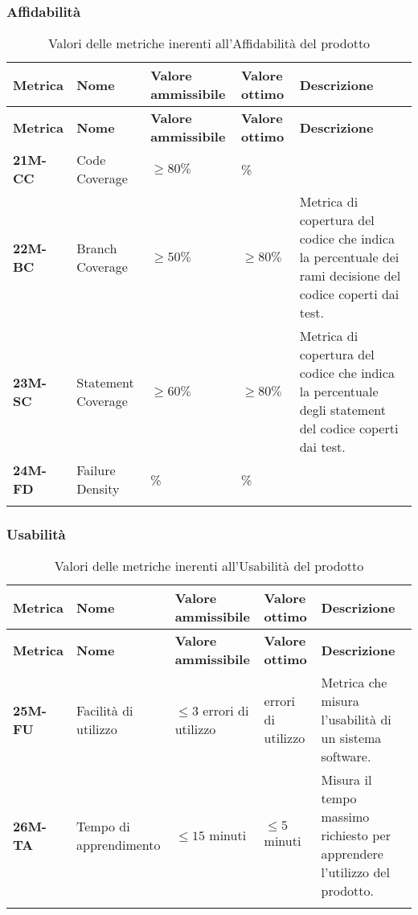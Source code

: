 \subsubsection{Affidabilità}
\begin{longtable}{|>{\centering\arraybackslash}p{}|>{\centering\arraybackslash}p{}|>{\centering\arraybackslash}p{}|>{\centering\arraybackslash}p{}|>{\centering\arraybackslash}p{}|}
    \hline
    \textbf{Metrica} & \textbf{Nome} & \textbf{Valore ammissibile} & \textbf{Valore ottimo}& \textbf{Descrizione}\\
	\hline
    \endfirsthead
    \hline
    \textbf{Metrica} & \textbf{Nome} & \textbf{Valore ammissibile} & \textbf{Valore ottimo}& \textbf{Descrizione}\\
    \endhead
	\hline
	\textbf{21M-CC} & Code Coverage & $\geq 80\% $  & 100\% &\\
	\hline
	\textbf{22M-BC} & Branch Coverage & $\geq 50\% $  & $\geq 80\% $ & Metrica di copertura del codice che indica la percentuale dei rami decisione del codice coperti dai test.\\ 
	\hline
	\textbf{23M-SC} & Statement Coverage & $\geq 60\% $ & $\geq 80\% $ & Metrica di copertura del codice che indica la percentuale degli statement del codice coperti dai test.\\ 
	\hline
	\textbf{24M-FD} & Failure Density & 100\%  & 100\%  &\\ 
	\hline
	\caption{ Valori delle metriche inerenti all'Affidabilità del prodotto}
	\label{table:8}
\end{longtable}
\subsubsection{Usabilità}
\begin{longtable}{|>{\centering\arraybackslash}p{}|>{\centering\arraybackslash}p{}|>{\centering\arraybackslash}p{}|>{\centering\arraybackslash}p{}|>{\centering\arraybackslash}p{}|}
    \hline
    \textbf{Metrica} & \textbf{Nome} & \textbf{Valore ammissibile} & \textbf{Valore ottimo}& \textbf{Descrizione}\\
	\hline
    \endfirsthead
    \hline
    \textbf{Metrica} & \textbf{Nome} & \textbf{Valore ammissibile} & \textbf{Valore ottimo}& \textbf{Descrizione}\\
    \endhead
	\textbf{25M-FU} & Facilità di utilizzo & $\leq 3 $ errori di utilizzo & 0 errori di utilizzo & Metrica che misura l'usabilità di un sistema software.\\
	\hline
	\textbf{26M-TA} & Tempo di apprendimento & $\leq 15 $ minuti  & $\leq 5 $ minuti & Misura il tempo massimo richiesto per apprendere l'utilizzo del prodotto. \\ 
	\hline

	\caption{ Valori delle metriche inerenti all'Usabilità del prodotto}
	\label{table:9}
\end{longtable}

